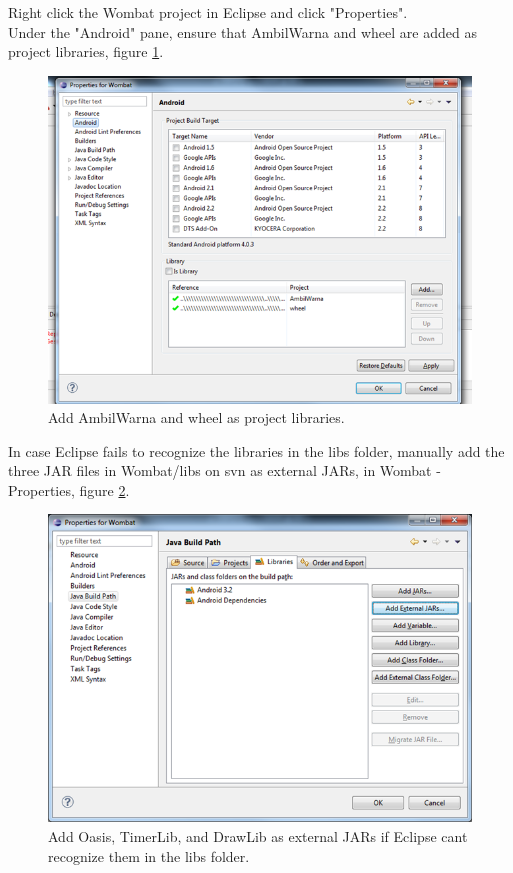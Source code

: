 Right click the Wombat project in Eclipse and click "Properties".\\
Under the "Android" pane, ensure that AmbilWarna and wheel are added as project libraries, figure \ref{fig:add_libs}.

\begin{figure}[H]
	\centering
		\includegraphics[scale=0.5]{Images/how_to_wombat/add_libs.png}
	\caption{Add AmbilWarna and wheel as project libraries.}
	\label{fig:add_libs}
\end{figure}

In case Eclipse fails to recognize the libraries in the libs folder, manually add the three JAR files in Wombat/libs on svn as external JARs, in Wombat - Properties, figure \ref{fig:external_jar}.

\begin{figure}[H]
	\centering
		\includegraphics[scale=0.5]{Images/how_to_wombat/external_jar.png}
	\caption{Add Oasis, TimerLib, and DrawLib as external JARs if Eclipse cant recognize them in the libs folder.}
	\label{fig:external_jar}
\end{figure}

